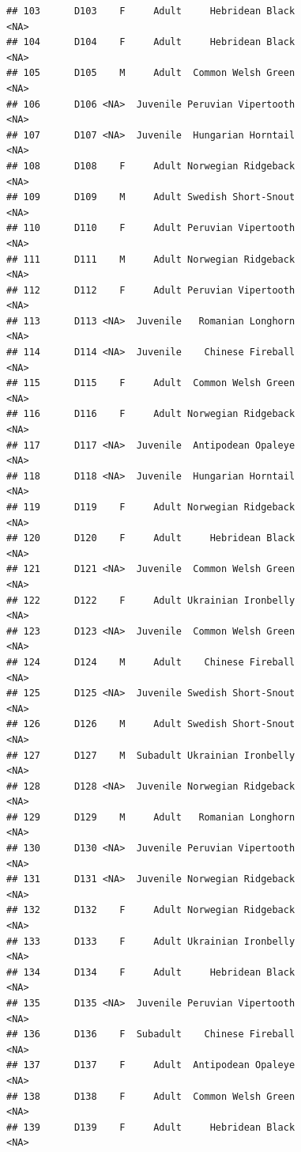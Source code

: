 \documentclass[
]{book}
\begin{document}
\begin{verbatim}
## 103      D103    F     Adult     Hebridean Black                <NA>
## 104      D104    F     Adult     Hebridean Black                <NA>
## 105      D105    M     Adult  Common Welsh Green                <NA>
## 106      D106 <NA>  Juvenile Peruvian Vipertooth                <NA>
## 107      D107 <NA>  Juvenile  Hungarian Horntail                <NA>
## 108      D108    F     Adult Norwegian Ridgeback                <NA>
## 109      D109    M     Adult Swedish Short-Snout                <NA>
## 110      D110    F     Adult Peruvian Vipertooth                <NA>
## 111      D111    M     Adult Norwegian Ridgeback                <NA>
## 112      D112    F     Adult Peruvian Vipertooth                <NA>
## 113      D113 <NA>  Juvenile   Romanian Longhorn                <NA>
## 114      D114 <NA>  Juvenile    Chinese Fireball                <NA>
## 115      D115    F     Adult  Common Welsh Green                <NA>
## 116      D116    F     Adult Norwegian Ridgeback                <NA>
## 117      D117 <NA>  Juvenile  Antipodean Opaleye                <NA>
## 118      D118 <NA>  Juvenile  Hungarian Horntail                <NA>
## 119      D119    F     Adult Norwegian Ridgeback                <NA>
## 120      D120    F     Adult     Hebridean Black                <NA>
## 121      D121 <NA>  Juvenile  Common Welsh Green                <NA>
## 122      D122    F     Adult Ukrainian Ironbelly                <NA>
## 123      D123 <NA>  Juvenile  Common Welsh Green                <NA>
## 124      D124    M     Adult    Chinese Fireball                <NA>
## 125      D125 <NA>  Juvenile Swedish Short-Snout                <NA>
## 126      D126    M     Adult Swedish Short-Snout                <NA>
## 127      D127    M  Subadult Ukrainian Ironbelly                <NA>
## 128      D128 <NA>  Juvenile Norwegian Ridgeback                <NA>
## 129      D129    M     Adult   Romanian Longhorn                <NA>
## 130      D130 <NA>  Juvenile Peruvian Vipertooth                <NA>
## 131      D131 <NA>  Juvenile Norwegian Ridgeback                <NA>
## 132      D132    F     Adult Norwegian Ridgeback                <NA>
## 133      D133    F     Adult Ukrainian Ironbelly                <NA>
## 134      D134    F     Adult     Hebridean Black                <NA>
## 135      D135 <NA>  Juvenile Peruvian Vipertooth                <NA>
## 136      D136    F  Subadult    Chinese Fireball                <NA>
## 137      D137    F     Adult  Antipodean Opaleye                <NA>
## 138      D138    F     Adult  Common Welsh Green                <NA>
## 139      D139    F     Adult     Hebridean Black                <NA>

\end{verbatim}
\end{document}
